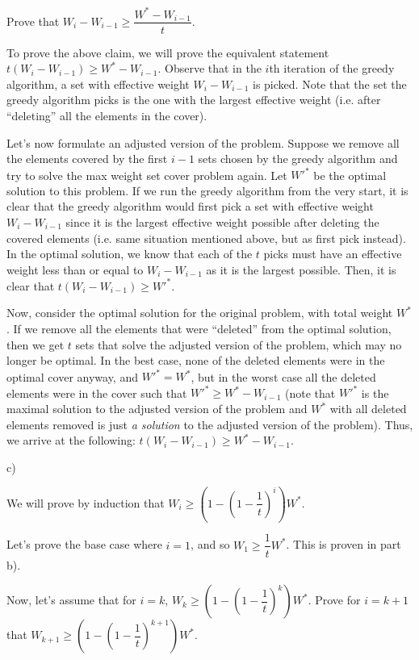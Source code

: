\documentclass{article}
\begin{document}
Prove that $W_i - W_{i-1} \geq \dfrac{W^* - W_{i-1}}{t}$.

To prove the above claim, we will prove the equivalent statement $t(W_i - W_{i-1}) \geq W^* - W_{i-1}$.
Observe that in the $i$th iteration of the greedy algorithm, a set with effective weight $W_i - W_{i-1}$ is picked. Note
that the set the greedy algorithm picks is the one with the largest effective weight (i.e. after ``deleting'' all the
elements in the cover).

Let's now formulate an adjusted version of the problem. Suppose we remove all the elements covered by the first $i-1$
sets chosen by the greedy algorithm and try to solve the max weight set cover problem again. Let $W'^*$ be the optimal
solution to this problem. If we run the greedy algorithm from the very start, it is clear that the greedy algorithm
would first pick a set with effective weight $W_i - W_{i-1}$ since it is the largest effective weight possible after
deleting the covered elements (i.e. same situation mentioned above, but as first pick instead). In the optimal
solution, we know that each of the $t$ picks must have an effective weight less than or equal to $W_i - W_{i-1}$ as it
is the largest possible. Then, it is clear that $t(W_i - W_{i-1}) \geq W'^*$.

Now, consider the optimal solution for the original problem, with total weight $W^*$. If we remove all the
elements that were ``deleted'' from the optimal solution, then we get $t$ sets that solve the adjusted version of the
problem, which may no longer be optimal. In the best case, none of the deleted elements were in the optimal cover
anyway, and $W'^* = W^*$, but in the worst case all the deleted elements were in the cover such that $W'^* \geq W^* -
W_{i-1}$ (note that $W'^*$ is the maximal solution to the adjusted version of the problem and $W^*$ with all deleted
elements removed is just \textit{a solution} to the adjusted version of the problem). Thus, we arrive at the
following: $t(W_i - W_{i-1}) \geq W^* - W_{i-1}$.

c)

We will prove by induction that $W_i \geq (1 - (1 - \dfrac{1}{t})^i) W^*$.

Let's prove the base case where $i=1$, and so $W_1 \geq \dfrac{1}{t} W^*$. This is proven in part b).

Now, let's assume that for $i=k$, $W_k \geq (1 - (1 - \dfrac{1}{t})^k) W^*$. Prove for $i = k + 1$ that $W_{k+1} \geq (1 - (1 -
\dfrac{1}{t})^{k+1}) W^*$.
\end{document}
